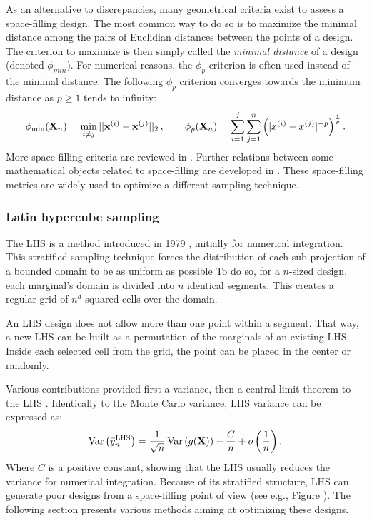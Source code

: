 As an alternative to discrepancies, many geometrical criteria exist to assess a space-filling design.
The most common way to do so is to maximize the minimal distance among the pairs of Euclidian distances between the points of a design.  
The criterion to maximize is then simply called the \textit{minimal distance} of a design (denoted $\phi_{min}$). 
For numerical reasons, the $\phi_p$ criterion is often used instead of the minimal distance. 
The following $\phi_p$ criterion converges towards the minimum distance as $p\geq1$ tends to infinity:
\begin{equation} 
    \phi_{\min}({\bf X}_n) = \min_{i \neq j} ||{\bf x}^{(i)} - {\bf x}^{(j)}||_2\, , \qquad
    \phi_p({\bf X}_n) = \sum_{i=1}^{j} \sum_{j=1}^{n} \left( |x^{(i)} - x^{(j)}|^{-p} \right)^{\frac{1}{p}}.
\end{equation}
More space-filling criteria are reviewed in \citet{abtini_2018}. 
Further relations between some mathematical objects related to space-filling are developed in \citet{pronzato_2012}.
These space-filling metrics are widely used to optimize a different sampling technique.


\subsubsection{Latin hypercube sampling}
The LHS is a method introduced in 1979 \citep{mckay_beckman_1979}, initially for numerical integration.
This stratified sampling technique forces the distribution of each sub-projection of a bounded domain to be as uniform as possible
To do so, for a $n$-sized design, each marginal's domain is divided into $n$ identical segments.
This creates a regular grid of $n^{d}$ squared cells over the domain. 

An LHS design does not allow more than one point within a segment. 
That way, a new LHS can be built as a permutation of the marginals of an existing LHS.
Inside each selected cell from the grid, the point can be placed in the center or randomly.

Various contributions provided first a variance, then a central limit theorem to the LHS \citep{owen_1996}.
Identically to the Monte Carlo variance, LHS variance can be expressed as:
\begin{equation}
    \operatorname{Var}\left(\Bar{y}_n^{\textrm{LHS}}\right) = \frac{1}{\sqrt{n}} \operatorname{Var}\left(g({\bf X})\right) - \frac{C}{n} + o\left( \frac1n \right). 
\end{equation}
Where $C$ is a positive constant, showing that the LHS usually reduces the variance for numerical integration. 
Because of its stratified structure, LHS can generate poor designs from a space-filling point of view (see e.g., Figure ). 
The following section presents various methods aiming at optimizing these designs.


